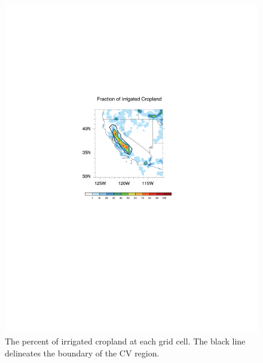 \documentclass[draft,ms]{agutex}   %
\begin{document}
\begin{figure}
\begin{center}
\includegraphics[width=6in]{irrigatedArea.pdf}
\caption{The percent of irrigated cropland at each grid cell.  The black line delineates the boundary of the CV region.}
\label{fig:Figure 2}
\end{center}
\end{figure}
\end{document}
